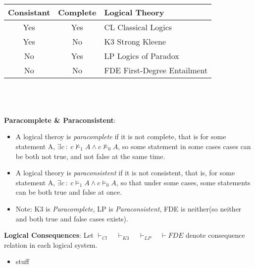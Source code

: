 \documentclass{article}
\begin{document}
\begin{tabular}{c | c| l}
    \hline
    Consistant & Complete & Logical Theory\\
    \hline
    Yes & Yes & CL Classical Logics\\
    
    Yes & No & K3 Strong Kleene\\
    No & Yes & LP Logics of Paradox \\
    No & No & FDE First-Degree Entailment\\
    \hline
    
\end{tabular}\\  \\ \\


\noindent\textbf{Paracomplete \& Paraconsistent}: 
\begin{itemize}
    \large
    \item A logical theroy is \emph{paracomplete} 
    if it is not complete, that is for some statement A, $\exists c\ :\  c\not \models_1 A \wedge c \not \models_0 A$,
    so some statement in some cases cases can be both not true, and not false at the same time.
    \item A logical theory is \emph{paraconsistent} if it is not consistent, that is, for some statement A, 
    $\exists c \ :\ c \models_1 A \wedge c \models_0 A$, so that under some cases, some statements can be 
    both true and false at once.
    \item Note: K3 is \emph{Paracomplete}, LP is \emph{Paraconsistent}, FDE is neither(so neither and both true and false cases exists).
    
\end{itemize}

\noindent \textbf{Logical Consequences}: 
Let $\vdash_{Cl}\quad \vdash_{K3} \quad \vdash_{LP}\quad \vdash{FDE}$ denote consequence relation in each logical system.
\begin{itemize}
    \item stuff
\end{itemize}
\end{document}
